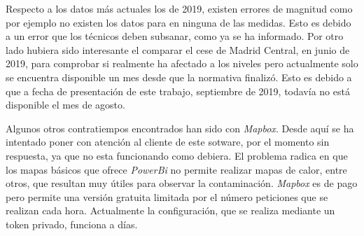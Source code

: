 Respecto a los datos más actuales los de 2019, existen errores de magnitud como por ejemplo no existen los datos para  en ninguna de las medidas. Esto es debido a un error que los técnicos deben subsanar, como ya se ha informado. Por otro lado hubiera sido interesante el comparar el cese de Madrid Central, en junio de 2019, para comprobar si realmente ha afectado a los niveles pero actualmente solo se encuentra disponible un mes desde que la normativa finalizó. Esto es debido a que a fecha de presentación de este trabajo, septiembre de 2019, todavía no está disponible el mes de agosto. 

Algunos otros contratiempos encontrados han sido con \textit{Mapbox}. Desde aquí se ha intentado poner con atención al cliente de este sotware, por el momento sin respuesta, ya que no esta funcionando como debiera. El problema radica en que los mapas básicos que ofrece \textit{PowerBi} no permite realizar mapas de calor, entre otros, que resultan muy útiles para observar la contaminación. \textit{Mapbox} es de pago pero permite una versión gratuita limitada por el número peticiones que se realizan cada hora. Actualmente la configuración, que se realiza mediante un token privado, funciona a días. 
 

